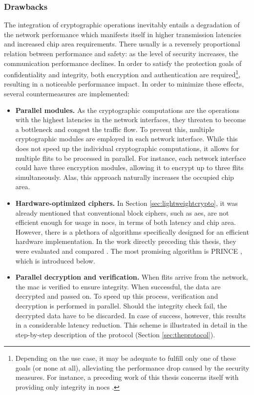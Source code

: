 \subsubsection{Drawbacks}\label{subsubsec:cryptodrawbacks}
The integration of cryptographic operations inevitably entails a degradation of the network performance which manifests itself in higher transmission
latencies and increased chip area requirements. There usually is a reversely proportional relation between performance and safety: as the level of security
increases, the communication performance declines. In order to satisfy the protection goals of confidentiality and integrity, both encryption and
authentication are required\footnote{Depending on the use case, it may be adequate to fulfill only one of these goals (or none at all), alleviating
the performance drop caused by the security measures. For instance, a preceding work of this thesis concerns itself with providing only integrity in
\glspl{noc} \cite{moriam18activeattackers}.}, resulting in a noticeable performance impact. In order to minimize these effects, several countermeasures
are implemented:
\begin{itemize}
    \item \textbf{Parallel modules.} As the cryptographic computations are the operations with the highest latencies in the network interfaces, they
        threaten to become a bottleneck and congest the traffic flow. To prevent this, multiple cryptographic modules are employed in each network
        interface. While this does not speed up the individual cryptographic computations, it allows for multiple flits to be processed in parallel. For
        instance, each network interface could have three encryption modules, allowing it to encrypt up to three flits simultaneously. Alas, this
        approach naturally increases the occupied chip area.
    \item \textbf{Hardware-optimized ciphers.} In Section \ref{sec:lightweightcrypto}, it was already mentioned that conventional block ciphers, such
        as \gls{aes}, are not efficient enough for usage in \glspl{noc}, in terms of both latency and chip area. However, there is a plethora of
        algorithms specifically designed for an efficient hardware implementation. In the work directly preceding this thesis, they were evaluated and
        compared \cite{harttung17lightweightcrypto}. The most promising algorithm is PRINCE \cite{borghoff12prince}, which is introduced below.
    \item \textbf{Parallel decryption and verification.} When flits arrive from the network, the \gls{mac} is verified to ensure integrity. When
        successful, the data are decrypted and passed on. To speed up this process, verification and decryption is performed in parallel. Should the
        integrity check fail, the decrypted data have to be discarded. In case of success, however, this results in a considerable latency reduction.
        This scheme is illustrated in detail in the step-by-step description of the protocol (Section \ref{sec:theprotocol}).
\end{itemize}

